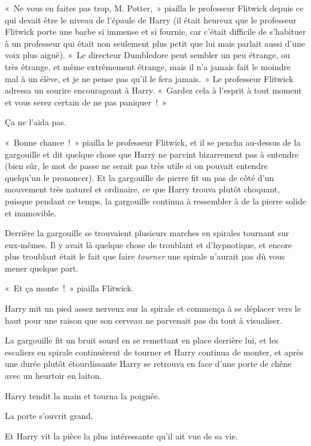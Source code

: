 «~Ne vous en faites pas trop, M. Potter,~» piailla le professeur Flitwick depuis ce qui devait être le niveau de l'épaule de Harry (il était heureux que le professeur Flitwick porte une barbe si immense et si fournie, car c'était difficile de s'habituer à un professeur qui était non seulement plus petit que lui mais parlait aussi d'une voix plus aiguë). «~Le directeur Dumbledore peut sembler un peu étrange, ou très étrange, et même extrêmement étrange, mais il n'a jamais fait le moindre mal à un élève, et je ne pense pas qu'il le fera jamais.~» Le professeur Flitwick adressa un sourire encourageant à Harry. «~Gardez cela à l'esprit à tout moment et vous serez certain de ne pas paniquer~!~»

Ça ne l'aida pas.

«~Bonne chance~!~» piailla le professeur Flitwick, et il se pencha au-dessus de la gargouille et dit quelque chose que Harry ne parvint bizarrement pas à entendre (bien sûr, le mot de passe ne serait pas très utile si on pouvait entendre quelqu'un le prononcer). Et la gargouille de pierre fit un pas de côté d'un mouvement très naturel et ordinaire, ce que Harry trouva plutôt choquant, puisque pendant ce temps, la gargouille continua à ressembler à de la pierre solide et inamovible.

Derrière la gargouille se trouvaient plusieurs marches en spirales tournant sur eux-mêmes. Il y avait là quelque chose de troublant et d'hypnotique, et encore plus troublant était le fait que faire \emph{tourner} une spirale n'aurait pas dû vous mener quelque part.

«~Et ça monte~!~» piailla Flitwick.

Harry mit un pied assez nerveux sur la spirale et commença à se déplacer vers le haut pour une raison que son cerveau ne parvenait pas du tout à visualiser.

La gargouille fit un bruit sourd en se remettant en place derrière lui, et les escaliers en spirale continuèrent de tourner et Harry continua de monter, et après une durée plutôt étourdissante Harry se retrouva en face d'une porte de chêne avec un heurtoir en laiton.

Harry tendit la main et tourna la poignée.

La porte s'ouvrit grand.

Et Harry vit la pièce la plus intéressante qu'il ait vue de sa vie.

